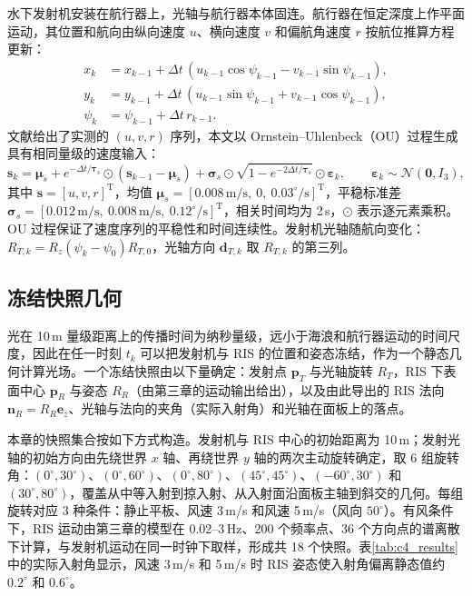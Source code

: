 水下发射机安装在航行器上，光轴与航行器本体固连。航行器在恒定深度上作平面运动，其位置和航向由纵向速度 $u$、横向速度 $v$ 和偏航角速度 $r$ 按航位推算方程更新：
\begin{equation}
\begin{aligned}
x_{k}&=x_{k-1}+\Delta t\,(u_{k-1}\cos\psi_{k-1}-v_{k-1}\sin\psi_{k-1}),\\
y_{k}&=y_{k-1}+\Delta t\,(u_{k-1}\sin\psi_{k-1}+v_{k-1}\cos\psi_{k-1}),\\
\psi_{k}&=\psi_{k-1}+\Delta t\,r_{k-1}.
\end{aligned}
\label{eq:c4_deadreckon}
\end{equation}
文献\cite{weng2022pointing}给出了实测的 $(u,v,r)$ 序列，本文以 Ornstein--Uhlenbeck（OU）过程生成具有相同量级的速度输入：
\begin{equation}
\mathbf s_k=\boldsymbol\mu_s+e^{-\Delta t/\boldsymbol\tau_s}\odot(\mathbf s_{k-1}-\boldsymbol\mu_s)+\boldsymbol\sigma_s\odot\sqrt{1-e^{-2\Delta t/\boldsymbol\tau_s}}\odot\boldsymbol\varepsilon_k,\qquad \boldsymbol\varepsilon_k\sim\mathcal N(\mathbf 0,I_3),
\label{eq:c4_ou}
\end{equation}
其中 $\mathbf s=[u,v,r]^{\mathrm T}$，均值 $\boldsymbol\mu_s=[0.008\,\mathrm{m/s},\ 0,\ 0.03^\circ/\mathrm s]^{\mathrm T}$，平稳标准差 $\boldsymbol\sigma_s=[0.012\,\mathrm{m/s},\ 0.008\,\mathrm{m/s},\ 0.12^\circ/\mathrm s]^{\mathrm T}$，相关时间均为 2\,s，$\odot$ 表示逐元素乘积。OU 过程保证了速度序列的平稳性和时间连续性。发射机光轴随航向变化：$R_{T,k}=R_z(\psi_k-\psi_0)R_{T,0}$，光轴方向 $\mathbf d_{T,k}$ 取 $R_{T,k}$ 的第三列。

\subsection{冻结快照几何}

光在 10\,m 量级距离上的传播时间为纳秒量级，远小于海浪和航行器运动的时间尺度，因此在任一时刻 $t_k$ 可以把发射机与 RIS 的位置和姿态冻结，作为一个静态几何计算光场。一个冻结快照由以下量确定：发射点 $\mathbf p_T$ 与光轴旋转 $R_T$，RIS 下表面中心 $\mathbf p_R$ 与姿态 $R_R$（由第三章的运动输出给出），以及由此导出的 RIS 法向 $\mathbf n_R=R_R\mathbf e_z$、光轴与法向的夹角（实际入射角）和光轴在面板上的落点。

本章的快照集合按如下方式构造。发射机与 RIS 中心的初始距离为 10\,m；发射光轴的初始方向由先绕世界 $x$ 轴、再绕世界 $y$ 轴的两次主动旋转确定，取 6 组旋转角：$(0^\circ,30^\circ)$、$(0^\circ,60^\circ)$、$(0^\circ,80^\circ)$、$(45^\circ,45^\circ)$、$(-60^\circ,30^\circ)$ 和 $(30^\circ,80^\circ)$，覆盖从中等入射到掠入射、从入射面沿面板主轴到斜交的几何。每组旋转对应 3 种条件：静止平板、风速 3\,m/s 和风速 5\,m/s（风向 $50^\circ$）。有风条件下，RIS 运动由第三章的模型在 0.02--3\,Hz、200 个频率点、36 个方向点的谱离散下计算，与发射机运动在同一时钟下取样，形成共 18 个快照。表\ref{tab:c4_results}中的实际入射角显示，风速 3\,m/s 和 5\,m/s 时 RIS 姿态使入射角偏离静态值约 $0.2^\circ$ 和 $0.6^\circ$。

